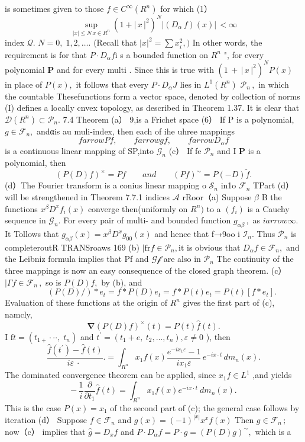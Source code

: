 is sometimes given to those $f\in C^{\infty}(R^{n})$ for which (1） $$ \operatorname*{sup}_{\left|x\right|\le N\textrm{}\,x\in R^{n}}(1+\left|\,x\,\right|^{2})^{N} |(D_{\alpha}\,f)(x) |\,<\infty $$ index ${\mathcal{Q}}.$ $N=0,\;1,2,\ldots.$ (Recall that $|x|^{2}=\sum x_{i}^{2},)$ In other words, the requirement is for that $P\cdot D_{\alpha}f{\mathrm{i}}$ s a bounded function on $R^{n}$ ", for every polynomial $\boldsymbol{P}$ and for every multi . Since this is true with $(1\,+\,\vert\,x\,\vert^{2})^{N}P(x)$ in place of $P(x),$ it follows that every $P\cdot D_{\alpha}J$ lies in $L^{1}(R^{n})$ ${\mathcal{P}}_{n}\,,$ in which the countable Thesefunctions form a vector space, denoted by collection of norms (I) defines a locally cnvex topology, as described in Theorem 1.37. It is clear that $\mathcal{D}(R^{n})\subset\mathcal{P}_{n}.$ 7.4 Theorem (a） 9,is a Frichet space (6） If P is a polynomial, $g\in{\mathcal{F}}_{n},$ andαis au muli-index, then each of ihe uhree mappings $$ f arrow P f,\qquad f arrow g f,\qquad f arrow D_{\alpha}f $$ is a continuous linear mapping of SP,into ${\mathcal{G}}_{n}$ (c） If fe ${\mathcal{P}}_{n}$ and I ${\boldsymbol{P}}$ is a polynomial, then $$ (P(D)f)^{\times}=P f\qquad a n d\qquad(P f)^{\sim}=P(-D){\tilde{f}}. $$ (d）The Fourier transform is a conius linear mapping o ${\mathcal{S}}_{n}$ in1o ${\mathcal{F}}_{n}$ TPart (d） will be strengthened in Theorem 7.7.1 indices $\textstyle{\mathcal{A}}$ rRoor（a) Suppose $\beta$ B the functions $x^{\beta}D^{x}f_{i}(x)$ converge then(uniformly on $R^{n})$ to a $(f_{i})$ is a Cauchy sequence in ${\mathcal{G}}_{n}.$ For every pair of multi- and bounded function $\scriptstyle g_{\alpha\beta}\,,$ as $i arrow\infty.$ It Tollows that $g_{\alpha\beta}(x)=x^{\beta}D^{x}g_{00}(x)$ and hence that f→9oo i ${\mathcal{I}}_{n}.$ Thus ${\mathcal{P}}_{n}$ is completeroutR TRANSroaws 169 (b) $|{\mathrm{fr}}f\in{\mathcal{P}}_{n},{\mathrm{it}}$ is obvious that $D_{\alpha}f\in{\mathcal{F}}_{n},$ and the Leibniz formula implies that Pf and ${\mathcal{G}}{\mathcal{f}}$ are also in ${\mathcal{P}}_{n}$ The continuity of the three mappings is now an easy consequence of the closed graph theorem. (c） $|\Gamma f\in{\mathcal{F}}_{n}\,,$ so is $P(D)f,$ by (b), and $$ \qquad(P(D)/)*e_{t}=f*P(D)e_{t}=f*P(t)e_{t}=P(t)[f*e_{t}]. $$ Evaluation of these functions at the origin of $R^{n}$ gives the first part of (c), namcly, $$ \mathbf{\nabla}(P(D)f)^{\times}(t)=P(t){\hat{f}}(t). $$ ${\textrm{I f}}t=(t_{1+}\cdot\cdot\cdot,\;t_{n})$ and $t^{\prime}=(t_{1}+e,\ t_{2},\dots,t_{n}),\varepsilon\neq0$ ), then $$ \frac{\hat{f}(t^{\prime})-\hat{f}(t)}{i\varepsilon\ \cdot\ }.=\int_{\scriptscriptstyle{R^{n}}}x_{1}f(x)\frac{e^{-i x_{1}\varepsilon}-1}{i x_{1}\varepsilon}\,e^{-i x\cdot t}\,d m_{n}(x). $$ The dominated convergence theorem can be applied, since $x_{1}f\in L^{1}$ ,and yields $$ -\,\frac{1}{i}\frac{\partial}{\partial t_{1}}{\hat{f}}(t)=\int_{R^{n}}x_{1}f(x)e^{-i x\cdot t}\ d m_{n}(x). $$ This is the case $P(x)=x_{1}$ of the second part of (c); the general case follows by iteration (d） Suppose $f\in{\mathcal{F}}_{n}$ and $g(x)=(-1)^{|x|}x^{x}f(x)$ Then $g\in{\mathcal{F}}_{n}\,;$ now（c） implies that ${\hat{g}}=D_{x}f$ and $P\cdot D_{\alpha}f=P\cdot\hat{g}=(P(D)g)^{\sim},$ which is a 
